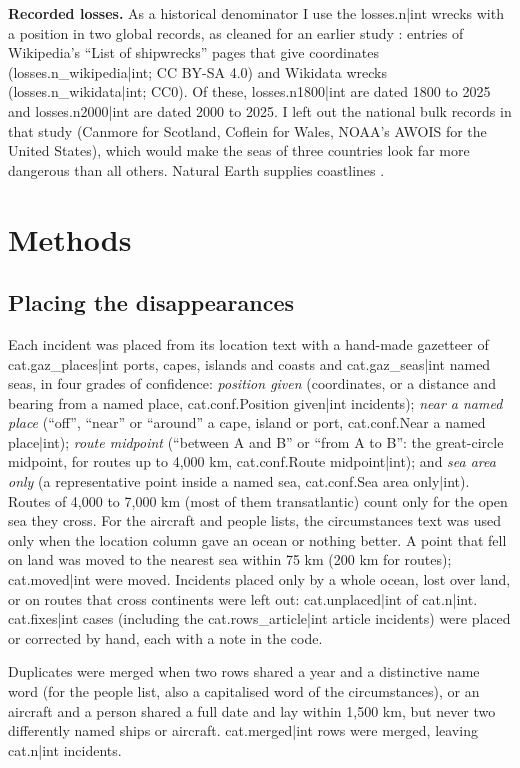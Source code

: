 \documentclass[11pt,a4paper]{article}
\begin{document}
\textbf{Recorded losses.} As a historical denominator I use the {{losses.n|int}} wrecks with a position in two global records, as cleaned for an earlier study \citep{hotham}: entries of Wikipedia's ``List of shipwrecks'' pages that give coordinates ({{losses.n_wikipedia|int}}; CC BY-SA 4.0) and Wikidata wrecks ({{losses.n_wikidata|int}}; CC0). Of these, {{losses.n1800|int}} are dated 1800 to 2025 and {{losses.n2000|int}} are dated 2000 to 2025. I left out the national bulk records in that study (Canmore for Scotland, Coflein for Wales, NOAA's AWOIS for the United States), which would make the seas of three countries look far more dangerous than all others. Natural Earth supplies coastlines \citep{naturalearth}.

\section{Methods}
\subsection{Placing the disappearances}
Each incident was placed from its location text with a hand-made gazetteer of {{cat.gaz_places|int}} ports, capes, islands and coasts and {{cat.gaz_seas|int}} named seas, in four grades of confidence: \emph{position given} (coordinates, or a distance and bearing from a named place, {{cat.conf.Position given|int}} incidents); \emph{near a named place} (``off'', ``near'' or ``around'' a cape, island or port, {{cat.conf.Near a named place|int}}); \emph{route midpoint} (``between A and B'' or ``from A to B'': the great-circle midpoint, for routes up to 4,000 km, {{cat.conf.Route midpoint|int}}); and \emph{sea area only} (a representative point inside a named sea, {{cat.conf.Sea area only|int}}). Routes of 4,000 to 7,000 km (most of them transatlantic) count only for the open sea they cross. For the aircraft and people lists, the circumstances text was used only when the location column gave an ocean or nothing better. A point that fell on land was moved to the nearest sea within 75 km (200 km for routes); {{cat.moved|int}} were moved. Incidents placed only by a whole ocean, lost over land, or on routes that cross continents were left out: {{cat.unplaced|int}} of {{cat.n|int}}. {{cat.fixes|int}} cases (including the {{cat.rows_article|int}} article incidents) were placed or corrected by hand, each with a note in the code.

Duplicates were merged when two rows shared a year and a distinctive name word (for the people list, also a capitalised word of the circumstances), or an aircraft and a person shared a full date and lay within 1,500 km, but never two differently named ships or aircraft. {{cat.merged|int}} rows were merged, leaving {{cat.n|int}} incidents.
\end{document}
